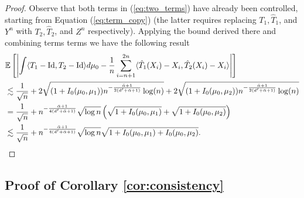 \documentclass[nohyperref]{article}
\DeclareMathOperator*{\id}{Id}
\theoremstyle{definition}
\begin{document}
\begin{proof}
    Observe that both terms in (\ref{eq:two_terms}) have already been controlled, starting from Equation (\ref{eq:term_copy}) (the latter requires replacing $T_1,\hat{T}_1$, and $Y^n$ with $T_2,\hat{T}_2$, and $Z^n$ respectively). Applying the bound derived there and combining terms terms we have the following result
    \begin{align*}
        &\mathbb{E}\left [ \left | \int \langle T_1 - \id, T_2 - \id \rangle d\mu_0 - \frac{1}{n} \sum_{i=n+1}^{2n} \langle \hat{T}_1(X_i) - X_i, \hat{T}_2(X_i) - X_i \rangle \right | \right ] \\
        & \lesssim \frac{1}{\sqrt{n}} + 2\sqrt{(1+I_0(\mu_0,\mu_1))n^{-\frac{\Bar{\alpha}+ 1}{2(d' + \Bar{\alpha} + 1)}}\log(n)} + 2\sqrt{(1+I_0(\mu_0,\mu_2))n^{-\frac{\Bar{\alpha}+ 1}{2(d' + \Bar{\alpha} + 1)}}\log(n)} \\
        &= \frac{1}{\sqrt{n}} + n^{-\frac{\Bar{\alpha}+ 1}{4(d' + \Bar{\alpha} + 1)}}\sqrt{\log n}\left (\sqrt{1+I_0(\mu_0,\mu_1)} + \sqrt{1+I_0(\mu_0,\mu_2)} \right ) \\
        &\lesssim \frac{1}{\sqrt{n}} + n^{-\frac{\Bar{\alpha}+ 1}{4(d' + \Bar{\alpha} + 1)}}\sqrt{\log n}\sqrt{1+I_0(\mu_0,\mu_1)+I_0(\mu_0,\mu_2)}.
    \end{align*}
\end{proof}

\subsection{Proof of Corollary \ref{cor:consistency}}\label{SM:Cor2Proof}
\end{document}
